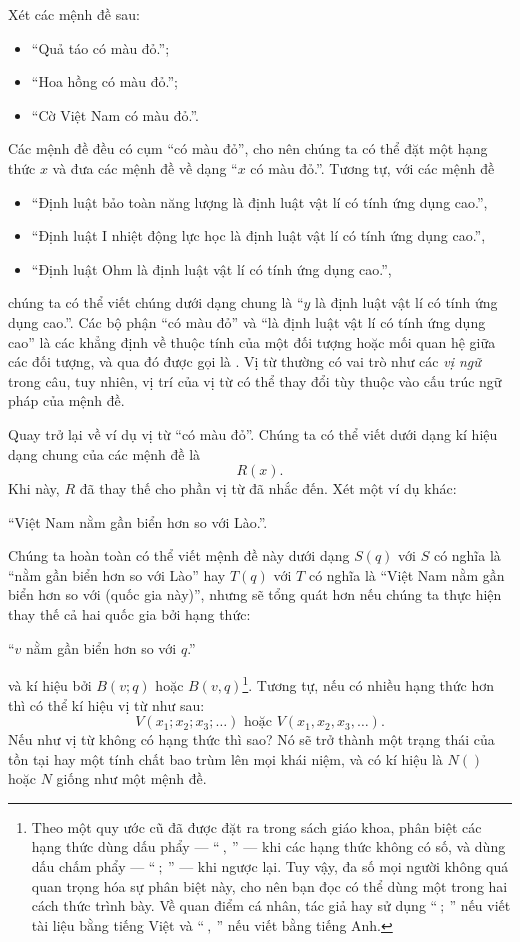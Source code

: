 Xét các mệnh đề sau:
\begin{itemize}
    \item ``Quả táo có màu đỏ.'';
    \item ``Hoa hồng có màu đỏ.'';
    \item ``Cờ Việt Nam có màu đỏ.''.
\end{itemize}
Các mệnh đề đều có cụm ``có màu đỏ'', cho nên chúng ta có thể đặt một hạng thức $x$ và đưa các mệnh đề về dạng ``$x$ có màu đỏ.''. Tương tự, với các mệnh đề
\begin{itemize}
    \item ``Định luật bảo toàn năng lượng là định luật vật lí có tính ứng dụng cao.'',
    \item ``Định luật I nhiệt động lực học là định luật vật lí có tính ứng dụng cao.'',
    \item ``Định luật Ohm là định luật vật lí có tính ứng dụng cao.'',
\end{itemize}
chúng ta có thể viết chúng dưới dạng chung là ``$y$ là định luật vật lí có tính ứng dụng cao.''. Các bộ phận ``có màu đỏ'' và ``là định luật vật lí có tính ứng dụng cao'' là các khẳng định về thuộc tính của một đối tượng hoặc mối quan hệ giữa các đối tượng, và qua đó được gọi là . Vị từ thường có vai trò như các \emph{vị ngữ} trong câu, tuy nhiên, vị trí của vị từ có thể thay đổi tùy thuộc vào cấu trúc ngữ pháp của mệnh đề.

Quay trở lại về ví dụ vị từ ``có màu đỏ''. Chúng ta có thể viết dưới dạng kí hiệu dạng chung của các mệnh đề là
$$R(x).$$
Khi này, $R$ đã thay thế cho phần vị từ đã nhắc đến. Xét một ví dụ khác:
\begin{center}
    ``Việt Nam nằm gần biển hơn so với Lào.''.
\end{center}
Chúng ta hoàn toàn có thể viết mệnh đề này dưới dạng $S(q)$ với $S$ có nghĩa là ``nằm gần biển hơn so với Lào'' hay $T(q)$ với $T$ có nghĩa là ``Việt Nam nằm gần biển hơn so với (quốc gia này)'', nhưng sẽ tổng quát hơn nếu chúng ta thực hiện thay thế cả hai quốc gia bởi hạng thức:
\begin{center}
    ``$v$ nằm gần biển hơn so với $q$.''
\end{center}
và kí hiệu bởi $B(v; q)$ hoặc $B(v, q)$\footnote{Theo một quy ước cũ đã được đặt ra trong sách giáo khoa, phân biệt các hạng thức dùng dấu phẩy --- ``$~,~$'' --- khi các hạng thức không có số, và dùng dấu chấm phẩy --- ``$~;~$'' --- khi ngược lại. Tuy vậy, đa số mọi người không quá quan trọng hóa sự phân biệt này, cho nên bạn đọc có thể dùng một trong hai cách thức trình bày. Về quan điểm cá nhân, tác giả hay sử dụng ``$~;~$'' nếu viết tài liệu bằng tiếng Việt và ``$~,~$'' nếu viết bằng tiếng Anh.}. Tương tự, nếu có nhiều hạng thức hơn thì có thể kí hiệu vị từ như sau:
$$
V(x_1;x_2;x_3;\dots) \text{ hoặc } V(x_1,x_2,x_3,\dots).
$$
Nếu như vị từ không có hạng thức thì sao? Nó sẽ trở thành một trạng thái của tồn tại hay một tính chất bao trùm lên mọi khái niệm, và có kí hiệu là $N()$ hoặc $N$ giống như một mệnh đề.

